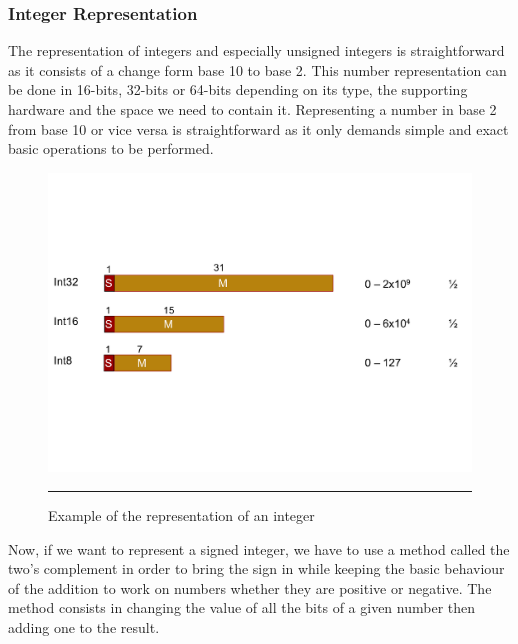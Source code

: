 \subsubsection{Integer Representation}

The representation of integers and especially unsigned integers is straightforward as it consists of a change form base 10 to base 2. This number representation can be done in 16-bits, 32-bits or 64-bits depending on its type, the supporting hardware and the space we need to contain it. Representing a number in base 2 from base 10 or vice versa is straightforward as it only demands simple and exact basic operations to be performed.

\begin{figure}[htbp]
	\centering
		\includegraphics{Figures/IntegerRepr.pdf}
		\rule{35em}{0.5pt}
	\caption[Integer Representation]{Example of the representation of an integer}
	\label{fig:IntegerRepr}
\end{figure}

Now, if we want to represent a signed integer, we have to use a method called the two's complement in order to bring the sign in while keeping the basic behaviour of the addition to work on numbers whether they are positive or negative. The method consists in changing the value of all the bits of a given number then adding one to the result.


